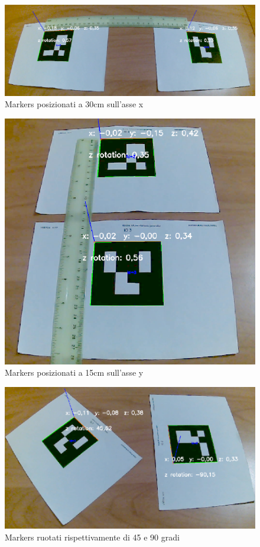\documentclass[12pt,a4paper,openright,twoside]{book}
\begin{document}
\begin{figure}[h!]
	\centering
	\includegraphics[width=0.8\linewidth]{./figures/Valutazione/markers_x.png}
	\caption{Markers posizionati a 30cm sull'asse x}
	\label{fig:markers_x}
\end{figure}
\begin{figure}[h!]
	\centering
	\includegraphics[width=0.8\linewidth]{./figures/Valutazione/markers_y.png}
	\caption{Markers posizionati a 15cm sull'asse y}
	\label{fig:markers_y}
\end{figure}
\begin{figure}[h!]
	\centering
	\includegraphics[width=0.8\linewidth]{./figures/Valutazione/markers_rotate.png}
	\caption{Markers ruotati rispettivamente di 45 e 90 gradi}
	\label{fig:markers_rotate}
\end{figure}
\end{document}

